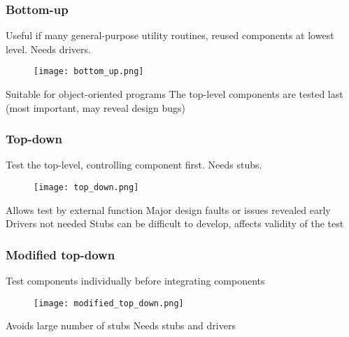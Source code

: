\subsubsection{Bottom-up}

Useful if many general-purpose utility routines, reused components at lowest level. \newline
Needs drivers.

\begin{figure}[!ht]
    \centering
    \texttt{[image: bottom\_up.png]}
\end{figure}


\begin{itemize}
        \proitem{} Suitable for object-oriented programs
    \consitem The top-level components are tested last (most important, may reveal design bugs)
\end{itemize}

\subsubsection{Top-down}
Test the top-level, controlling component first.
Needs stubs.

\begin{figure}[!ht]
    \centering
    \texttt{[image: top\_down.png]}
\end{figure}

\begin{itemize}
        \proitem{} Allows test by external function
    \proitem{} Major design faults or issues revealed early
    \proitem{} Drivers not needed
        \consitem{} Stubs can be difficult to develop, affects validity of the test
\end{itemize}

\subsubsection{Modified top-down}
Test components individually before integrating components

\begin{figure}[!ht]
    \centering
    \texttt{[image: modified\_top\_down.png]}
\end{figure}

\begin{itemize}
        \proitem{} Avoids large number of stubs
        \consitem{} Needs stubs and drivers
\end{itemize}

